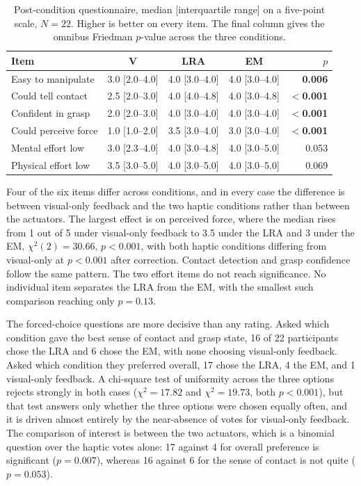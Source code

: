\documentclass[12pt, a4paper, twoside, openright]{report}
\begin{document}
\begin{table}[ht]
    \centering
    \caption{Post-condition questionnaire, median [interquartile range] on a
        five-point scale, $N=22$. Higher is better on every item. The final column
        gives the omnibus Friedman $p$-value across the three conditions.}
    \label{tab:likert}
    \begin{tabular}{@{}lcccr@{}}
        \toprule
        Item                 & V              & LRA            & EM             & $p$               \\
        \midrule
        Easy to manipulate   & 3.0 [2.0--4.0] & 4.0 [3.0--4.0] & 4.0 [3.0--4.0] & \textbf{0.006}    \\
        Could tell contact   & 2.5 [2.0--3.0] & 4.0 [4.0--4.8] & 4.0 [3.0--4.8] & \textbf{$<$0.001} \\
        Confident in grasp   & 2.0 [2.0--3.0] & 4.0 [3.0--4.0] & 4.0 [3.0--4.0] & \textbf{$<$0.001} \\
        Could perceive force & 1.0 [1.0--2.0] & 3.5 [3.0--4.0] & 3.0 [3.0--4.0] & \textbf{$<$0.001} \\
        Mental effort low    & 3.0 [2.3--4.0] & 4.0 [3.0--4.8] & 4.0 [3.0--5.0] & 0.053             \\
        Physical effort low  & 3.5 [3.0--5.0] & 4.0 [3.0--5.0] & 4.0 [3.0--5.0] & 0.069             \\
        \bottomrule
    \end{tabular}
\end{table}

Four of the six items differ across conditions, and in every case the
difference is between visual-only feedback and the two haptic conditions rather
than between the actuators. The largest effect is on perceived force, where the
median rises from 1 out of 5 under visual-only feedback to 3.5 under the LRA
and 3 under the EM, $\chi^2(2) = 30.66$, $p < 0.001$, with both haptic
conditions differing from visual-only at $p < 0.001$ after correction. Contact
detection and grasp confidence follow the same pattern. The two effort items do
not reach significance. No individual item separates the LRA from the EM, with the
smallest such comparison reaching only $p = 0.13$.

The forced-choice questions are more decisive than any rating. Asked which
condition gave the best sense of contact and grasp state, 16 of 22 participants
chose the LRA and 6 chose the EM, with none choosing visual-only feedback.
Asked which condition they preferred overall, 17 chose the LRA, 4 the EM, and 1
visual-only feedback. A chi-square test of uniformity across the three options
rejects strongly in both cases ($\chi^2 = 17.82$ and $\chi^2 = 19.73$, both
$p < 0.001$), but that test answers only whether the three options were chosen
equally often, and it is driven almost entirely by the near-absence of votes for
visual-only feedback. The comparison of interest is between the two actuators,
which is a binomial question over the haptic votes alone: 17 against 4 for
overall preference is significant ($p = 0.007$), whereas 16 against 6 for the
sense of contact is not quite ($p = 0.053$).
\end{document}
